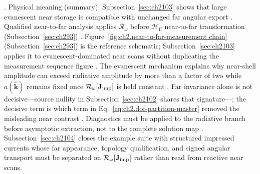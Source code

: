 \cite{stratton1941}.
Physical meaning (summary). Subsection~\ref{sec:ch2103} shows that large evanescent near storage is compatible with unchanged
far angular export \cite{stratton1941}. Qualified near-to-far
analysis applies \(\mathcal{R}_\omega\) before \(\mathcal{H}_{\mathrm{ff}}\)
near-to-far transformation (Subsection~\ref{sec:ch293}) \cite{stratton1941}. Figure~\ref{fig:ch2.near-to-far-measurement chain}
(Subsection~\ref{sec:ch293}) is the reference schematic; Subsection~\ref{sec:ch2103} applies it to
evanescent-dominated near scans without duplicating the measurement sequence figure
\cite{stratton1941}.
The evanescent mechanism explains why near-shell amplitude can exceed radiative amplitude by more than a factor of two while $a(\widehat{\mathbf{k}})$ remains fixed once $\mathcal{R}_\omega[\mathbf{J}_{\mathrm{imp}}]$ is held constant \cite{stratton1941}. Far invariance alone is not decisive---source nullity in Subsection~\ref{sec:ch2102} shares that signature---; the decisive term is which term in Eq.~\eqref{eq:ch2.dof-partition-master} removed the misleading near contrast \cite{harrington2001}. Diagnostics must be applied to the radiative branch before asymptotic extraction, not to the complete solution map \cite{stratton1941}. Subsection~\ref{sec:ch2104} closes the example suite with structured impressed currents whose far appearance, topology qualification, and signed angular transport must be separated on $\mathcal{R}_\omega[\mathbf{J}_{\mathrm{imp}}]$ rather than read from reactive near scans.
